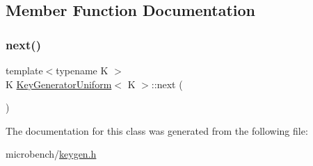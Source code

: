 \subsection{Member Function Documentation}
\mbox{\label{classKeyGeneratorUniform_a67fe5465611f10969b06e5d9d7c14d04}} 
\subsubsection{\texorpdfstring{next()}{next()}}
{\footnotesize\ttfamily template$<$typename K $>$ \\
K \hyperlink{classKeyGeneratorUniform}{Key\+Generator\+Uniform}$<$ K $>$\+::next (\begin{DoxyParamCaption}{ }\end{DoxyParamCaption})\hspace{0.3cm}{\ttfamily [inline]}}



The documentation for this class was generated from the following file\+:\begin{DoxyCompactItemize}
\item 
microbench/\hyperlink{keygen_8h}{keygen.\+h}\end{DoxyCompactItemize}
